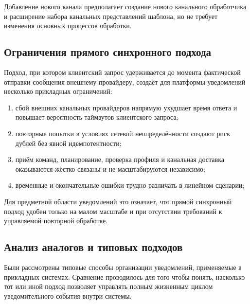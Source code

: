 Добавление нового канала предполагает создание нового канального обработчика и расширение набора канальных представлений шаблона, но не требует изменения основных процессов обработки.

\subsection{Ограничения прямого синхронного подхода}

Подход, при котором клиентский запрос удерживается до момента фактической отправки сообщения внешнему провайдеру, создаёт для платформы уведомлений несколько прикладных ограничений:
\begin{enumerate}
    \item сбой внешних канальных провайдеров напрямую ухудшает время ответа и повышает вероятность таймаутов клиентского запроса;
    \item повторные попытки в условиях сетевой неопределённости создают риск дублей без явной идемпотентности;
    \item приём команд, планирование, проверка профиля и канальная доставка оказываются жёстко связаны и не масштабируются независимо;
    \item временные и окончательные ошибки трудно различать в линейном сценарии;
\end{enumerate}

Для предметной области уведомлений это означает, что прямой синхронный подход удобен только на малом масштабе и при отсутствии требований к управляемой повторной обработке.

\subsection{Анализ аналогов и типовых подходов}

Были рассмотрены типовые способы организации уведомлений, применяемые в прикладных системах. Сравнение проводилось для того чтобы понять, насколько тот или иной подход позволяет управлять полным жизненным циклом уведомительного события внутри системы.

